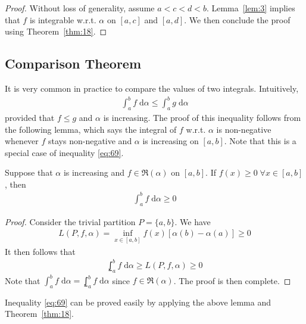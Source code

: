 \documentclass[thmcnt=section, 12pt]{my-elegantbook}
\begin{document}
\begin{proof}
    Without loss of generality, assume $a < c < d < b$. Lemma~\ref{lem:3} implies that $f$ is integrable w.r.t. $\alpha$ on $[a, c]$ and $[a, d]$. We then conclude the proof using Theorem~\ref{thm:18}.
\end{proof}


\subsection{Comparison Theorem}

It is very common in practice to compare the values of two integrals. Intuitively,
\begin{align}
    \int_{a}^{b} f \; \mathrm{d}\alpha
    \leq \int_{a}^{b} g \; \mathrm{d}\alpha
    \label{eq:69}
\end{align}
provided that $f \leq g$ and $\alpha$ is increasing. The proof of this inequality follows from the following lemma, which says the integral of $f$ w.r.t. $\alpha$ is non-negative whenever $f$ stays non-negative and $\alpha$ is increasing on $[a, b]$. Note that this is a special case of inequality \eqref{eq:69}.

\begin{lemma} \label{lem:1}
    Suppose that $\alpha$ is increasing and $f \in \mathfrak{R}(\alpha)$ on $[a, b]$. If $f(x) \geq 0 \; \forall x \in [a, b]$, then
    \begin{align*}
        \int_{a}^{b} f \; \mathrm{d}\alpha \geq 0
    \end{align*}
\end{lemma}

\begin{proof}
    Consider the trivial partition $P = \{a, b\}$. We have
    \begin{align*}
        L(P,f,\alpha) = \inf_{x \in [a, b]} f(x) [\alpha(b) - \alpha(a)]
        \geq 0
    \end{align*}
    It then follows that
    \begin{align*}
        \lowint_a^b f \; \mathrm{d}\alpha
        \geq L(P,f,\alpha)
        \geq 0
    \end{align*}
    Note that $\int_{a}^{b} f \; \mathrm{d}\alpha = \lowint_a^b f \; \mathrm{d}\alpha$ since $f \in \mathfrak{R}(\alpha)$. The proof is then complete.
\end{proof}

Inequality \eqref{eq:69} can be proved easily by applying the above lemma and Theorem~\ref{thm:18}.
\end{document}
